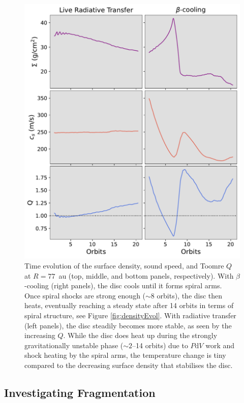 \documentclass[usenatbib]{mnras}
\begin{document}
\begin{figure}
    \centering
    \includegraphics[width=0.9\linewidth]{Images/compare_Q_evolution_at_r_twoColumn.pdf}
    \caption{Time evolution of the surface density, sound speed, and Toomre $Q$ at $R = 77$~au (top, middle, and bottom panels, respectively). With $\beta$-cooling (right panels), the disc cools until it forms spiral arms. Once spiral shocks are strong enough (${\sim}8$ orbits), the disc then heats, eventually reaching a steady state after 14 orbits in terms of spiral structure, see Figure \ref{fig:densityEvol}. With radiative transfer (left panels), the disc steadily becomes more stable, as seen by the increasing $Q$. While the disc does heat up during the strongly gravitationally unstable phase (${\sim}2$--14 orbits) due to $P\mathrm{d}V$ work and shock heating by the spiral arms, the temperature change is tiny compared to the decreasing surface density that stabilises the disc. 
    }
    \label{fig:Q_R77}
\end{figure}

\subsection{Investigating Fragmentation}
\end{document}
